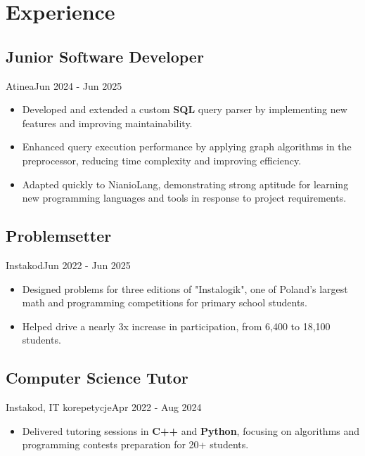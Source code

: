 \section{Experience}
\subsection{Junior Software Developer}{Atinea}{Jun 2024 - Jun 2025}
\begin{itemize}
    \item Developed and extended a custom \textbf{SQL} query parser by implementing new features and improving maintainability.
    \item Enhanced query execution performance by applying graph algorithms in the preprocessor, reducing time complexity and improving efficiency.
    \item Adapted quickly to NianioLang, demonstrating strong aptitude for learning new programming languages and tools in response to project requirements.
\end{itemize}

\subsection{Problemsetter}{Instakod}{Jun 2022 - Jun 2025}
\begin{itemize}
    \item Designed problems for three editions of "Instalogik", one of Poland's largest math and programming competitions for primary school students.
    \item Helped drive a nearly 3x increase in participation, from 6,400 to 18,100 students.
\end{itemize}

\subsection{Computer Science Tutor}{Instakod, IT korepetycje}{Apr 2022 - Aug 2024}
\begin{itemize}
    \item Delivered tutoring sessions in \textbf{C++} and \textbf{Python}, focusing on algorithms and programming contests preparation for 20+ students.
\end{itemize}

\vspace{1em}
